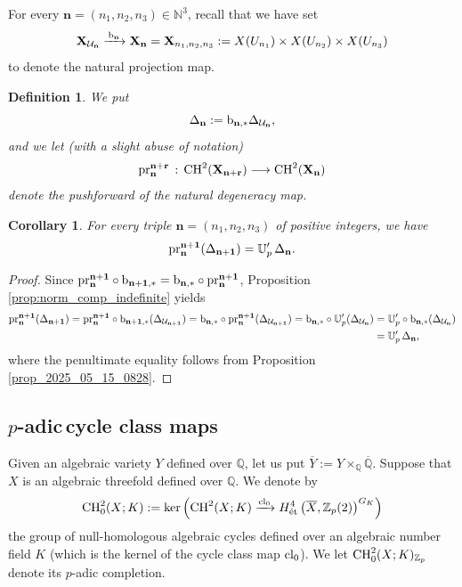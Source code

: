 \documentclass{amsart}
\numberwithin{equation}{section}
\newtheorem{corollary}[theorem]{Corollary}
\newtheorem{defn}[theorem]{Definition}
\newcommand{\QQ}{\mathbb{Q}}
\newcommand{\ZZ}{\mathbb{Z}}
\newcommand{\lra}{\longrightarrow}
\newcommand{\etale}{\textup{\'et}}
\begin{document}
For every ${\mathbf{n} } = (n_1,n_2,n_3) \in \mathbb N^3$, recall that we have set 
$$\mathbf{X}_{\mathcal{U}_{\mathbf{n}}}  \xrightarrow{\,{\rm b}_{\mathbf{n}}\,} \mathbf{X}_{\mathbf{n}}=\mathbf{X}_{n_1,n_2,n_3} := X({U_{n_1}}) \times X({U_{n_2}}) \times X({U_{n_3}})$$ to denote the natural projection map. 
\begin{defn}
    We put 
 $$\Delta_{\mathbf{n}} : = {\rm b}_{\mathbf{n},\ast} \Delta_{\mathcal{U}_{\mathbf{n}}},$$
 and we let (with a slight abuse of notation)
$${\rm pr}^{\mathbf{n}+\mathbf{r}}_{\mathbf{n}}\,:\, {\rm CH}^2(\mathbf{X}_{\mathbf{n+r}}) \lra {\rm CH}^2(\mathbf{X}_{\mathbf{n}})$$ 
denote the pushforward of the natural degeneracy map.
\end{defn}
\begin{corollary}
\label{cor_2025_07_02_1244}
    For every triple ${\mathbf{n} } = (n_1, n_2, n_3)$ of positive integers, we have 
 \[ {\rm pr}^{\mathbf{n}+\mathbf{1}}_{\mathbf{n}}(\Delta_{{\mathbf{n + 1} }}) = \mathbb{U}_p' \, \Delta_{\mathbf{n} }.\] 
\end{corollary}
\begin{proof}
    Since ${\rm pr}^{\mathbf{n}+\mathbf{1}}_{\mathbf{n}} \circ  {\rm b}_{\mathbf{n}+\mathbf{1},\ast} ={\rm b}_{\mathbf{n},\ast} \circ {\rm pr}^{\mathbf{n}+\mathbf{1}}_{\mathbf{n}}$, Proposition \ref{prop:norm_comp_indefinite} yields
    \begin{align*}
 {\rm pr}^{\mathbf{n}+\mathbf{1}}_{\mathbf{n}}(\Delta_{{\mathbf{n + 1} }}) =  {\rm pr}^{\mathbf{n}+\mathbf{1}}_{\mathbf{n}} \circ  {\rm b}_{\mathbf{n}+\mathbf{1},\ast}(\Delta_{\mathcal{U}_{\mathbf{n+1}}}) = {\rm b}_{\mathbf{n},\ast} \circ {\rm pr}^{\mathbf{n}+\mathbf{1}}_{\mathbf{n}}(\Delta_{\mathcal{U}_{\mathbf{n+1}}}) = {\rm b}_{\mathbf{n},\ast} \circ \mathbb{U}_p' ( \Delta_{\mathcal{U}_{\mathbf{n}}} ) &=\mathbb{U}_p' \circ {\rm b}_{\mathbf{n},\ast}  ( \Delta_{\mathcal{U}_{\mathbf{n}}} )\\
  &= \mathbb{U}_p' \,  \Delta_{\mathbf{n}}, 
 \end{align*} 
 where the penultimate equality follows from Proposition \ref{prop_2025_05_15_0828}.
\end{proof}



\subsection{\texorpdfstring{$p$-adic\,}\ cycle class maps} 
Given an algebraic variety $Y$ defined over $\QQ$, let us put $\overline{Y}:={Y}\times_\QQ \overline{\QQ}$. Suppose that $X$ is an algebraic threefold defined over $\QQ$. We denote by
$${\rm CH}^2_0(X; K) := \ker \left( {\rm CH}^2(X;K) \xrightarrow{{\rm cl}_0} H^4_{\etale} \left(\overline{X}, \ZZ_p(2)\right)^{G_K}\right)$$ 
the group of null-homologous algebraic cycles defined over an algebraic number field $K$ (which is the kernel of the cycle class map ${\rm cl}_0$). We let ${\rm CH}^2_0(X;K)_{\ZZ_p}$ denote its $p$-adic completion. 
\end{document}
